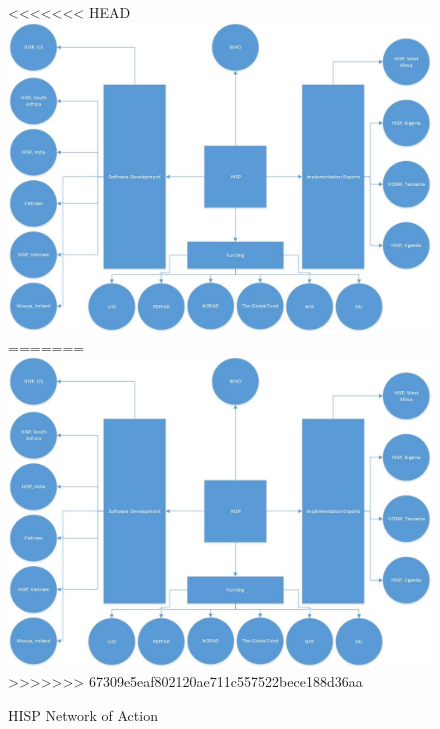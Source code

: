\begin{figure}
\centering
<<<<<<< HEAD
\includegraphics[width=\textwidth]{context/img/networkOfAction}
=======
\includegraphics[width=\columnwidth]{context/img/networkOfAction}
>>>>>>> 67309e5eaf802120ae711c557522bece188d36aa
\caption{HISP Network of Action}
\label{fig:hispnet}
\end{figure}

